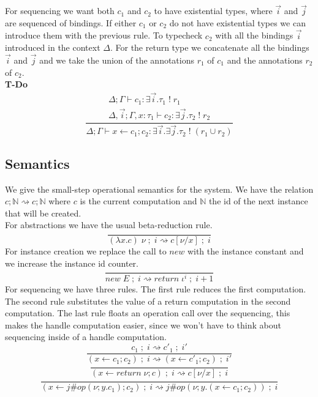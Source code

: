 \documentclass[12pt]{article}
\newcommand\op[0]{op}
\newcommand\ty[0]{\tau}
\newcommand\aty[2]{#1 \; ! \; #2}
\newcommand\texistss[2]{\exists \overrightarrow{#1} . #2}
\newcommand\val[0]{\nu}
\newcommand\vabs[2]{\lambda #1 . #2}
\newcommand\comp[0]{c}
\newcommand\creturn[1]{\textit{return} \; #1}
\newcommand\capp[2]{#1 \; #2}
\newcommand\cdo[3]{#1 \leftarrow #2 ; #3}
\newcommand\copi[5]{#1 \# #2(#3 ; #4 . #5)}
\newcommand\cnew[1]{\textit{new} \; #1}
\newcommand\sep[0]{\;;\;}
\begin{document}
For sequencing we want both $c_1$ and $c_2$ to have existential types, where $\overrightarrow{i}$ and $\overrightarrow{j}$ are sequenced of bindings. If either $c_1$ or $c_2$ do not have existential types we can introduce them with the previous rule.
To typecheck $c_2$ with all the bindings $\overrightarrow{i}$ introduced in the context $\Delta$. For the return type we concatenate all the bindings $\overrightarrow{i}$ and $\overrightarrow{j}$ and we take the union of the annotations $r_1$ of $c_1$ and the annotations $r_2$ of $c_2$. \\
\textbf{T-Do}
\[\frac{
	\begin{array}{l}
	\Delta;\Gamma \vdash c_1 : \texistss{i}{\aty{\ty_1}{r_1}} \\
	\Delta,\overrightarrow{i} ; \Gamma, x : \ty_1 \vdash c_2 : \texistss{j}{\aty{\ty_2}{r_2}}
	\end{array}
}{
	\Delta;\Gamma \vdash \cdo{x}{c_1}{c_2} : \texistss{i}{\texistss{j}{\aty{\ty_2}{(r_1 \cup r_2)}}}
}\]

\subsection{Semantics}
We give the small-step operational semantics for the system.
We have the relation $\comp; \mathbb{N} \rightsquigarrow \comp;\mathbb{N}$ where $\comp$ is the current computation and $\mathbb{N}$ the id of the next instance that will be created. \\
For abstractions we have the usual beta-reduction rule.\\
\[\frac{
}{
	\capp{(\vabs{x}{\comp})}{\val}\sep i \rightsquigarrow \comp[\val/x]\sep i
}\]
For instance creation we replace the call to $new$ with the instance constant and we increase the instance id counter.\\
\[\frac{
}{
	\cnew{E}\sep i \rightsquigarrow \creturn{\iota^i}\sep i + 1
}\]
\newpage
For sequencing we have three rules. The first rule reduces the first computation.
The second rule substitutes the value of a return computation in the second computation.
The last rule floats an operation call over the sequencing, this makes the handle computation easier, since we won't have to think about sequencing inside of a handle computation.\\
\[\frac{
	\comp_1\sep i \rightsquigarrow \comp'_1\sep i'
}{
	(\cdo{x}{\comp_1}{\comp_2})\sep i \rightsquigarrow (\cdo{x}{\comp'_1}{\comp_2})\sep i'
}\]
\[\frac{
}{
	(\cdo{x}{\creturn{\val}}{\comp})\sep i \rightsquigarrow \comp[\val/x]\sep i
}\]
\[\frac{
}{
	(\cdo{x}{\copi{j}{\op}{\val}{y}{\comp_1}}{\comp_2})\sep i \rightsquigarrow \copi{j}{\op}{\val}{y}{(\cdo{x}{\comp_1}{\comp_2})}\sep i
}\]
\end{document}
